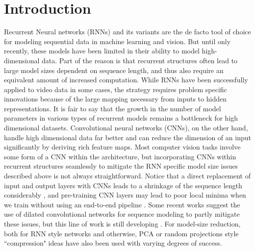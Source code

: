 \section{Introduction}\label{sec:intro}

Recurrent Neural networks (RNNs) and its variants are the de facto 
tool of choice 
for modeling sequential data in machine learning and vision.
But until only recently, these models have been limited in their ability to model high-dimensional data.
Part of the reason is that recurrent structures often lead to large model sizes dependent on sequence length, and thus also require an equivalent amount of increased computation.
While RNNs have been successfully applied to video data in some cases, the strategy 
requires problem specific innovations because of the large mapping necessary 
from inputs to hidden representations. It is fair to say that the growth 
in the number of model parameters in various types of 
recurrent models remains a bottleneck for high 
dimensional datasets. 
%
Convolutional neural networks (CNNs), on the other hand, 
handle high dimensional data
far better and 
can reduce the dimension of an input significantly by deriving rich feature maps. Most computer vision tasks involve some form of a CNN within the architecture, but incorporating CNNs within recurrent structures 
seamlessly to mitigate the RNN specific model size issues described above is not always straightforward.
Notice that a direct replacement of input and output layers with CNNs
leads to a shrinkage of the sequence length considerably \citep{srivastava2015unsupervised},
and pre-training CNN layers may lead to poor local minima
when we train without using an end-to-end pipeline \citep{donahue2015long}.
Some recent works suggest the use of dilated convolutional networks 
for sequence modeling \citep{yu2015multi} to partly mitigate these issues, but this line of work is still developing \citep{zhenIccv2019}. 
For model-size reduction, both for RNN style networks and otherwise, 
PCA or random projections \citep{ye2005two,bingham2001random} style ``compression" ideas have 
also been used with varying degrees of success.

